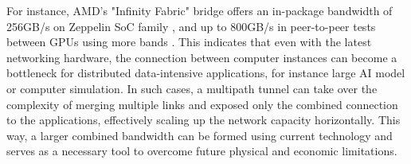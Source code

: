 For instance, AMD's "Infinity Fabric" bridge offers an in-package bandwidth of 256GB/s on Zeppelin SoC family \cite{burd_zeppelin_2019}, and up to 800GB/s in peer-to-peer tests between GPUs using more bands \cite{amd_infinity_architecture}.
This indicates that even with the latest networking hardware, the connection between computer instances can become a bottleneck for distributed data-intensive applications, for instance large \ac{AI} model or computer simulation. 
In such cases, a multipath tunnel can take over the complexity of merging multiple links and exposed only the combined connection to the applications, effectively scaling up the network capacity horizontally. 
This way, a larger combined bandwidth can be formed using current technology and serves as a necessary tool to overcome future physical and economic limitations.
%

